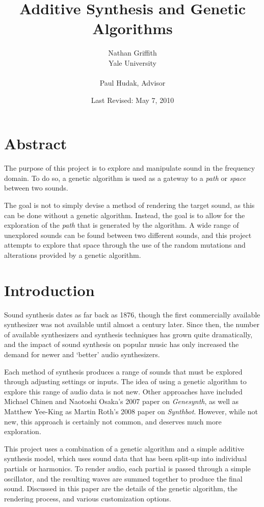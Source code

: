 \documentclass[11pt]{article}
\title{Additive Synthesis and Genetic Algorithms}
\author{Nathan Griffith\\Yale University
        \\\\Paul Hudak, Advisor}
\date{Last Revised: May 7, 2010}
\begin{document}
\maketitle %

\section{Abstract}

The purpose of this project is to explore and manipulate sound in the frequency domain. To do so, a genetic algorithm is used as a gateway to a \emph{path} or \emph{space} between two sounds. 

The goal is not to simply devise a method of rendering the target sound, as this can be done without a genetic algorithm. Instead, the goal is to allow for the exploration of the \emph{path} that is generated by the algorithm. A wide range of unexplored sounds can be found between two different sounds, and this project attempts to explore that space through the use of the random mutations and alterations provided by a genetic algorithm. 

\section{Introduction}

Sound synthesis dates as far back as 1876, though the first commercially available synthesizer was not available until almost a century later. Since then, the number of available synthesizers and synthesis techniques has grown quite dramatically, and the impact of sound synthesis on popular music has only increased the demand for newer and `better' audio synthesizers.

Each method of synthesis produces a range of sounds that must be explored through adjusting settings or inputs. The idea of using a genetic algorithm to explore this range of audio data is not new. Other approaches have included Michael Chinen and Naotoshi Osaka's 2007 paper on \emph{Genesynth}\cite{genesynth}, as well as Matthew Yee-King as Martin Roth's 2008 paper on \emph{Synthbot}\cite{synthbot}. However, while not new, this approach is certainly not common, and deserves much more exploration.

This project uses a combination of a genetic algorithm and a simple additive synthesis model, which uses sound data that has been split-up into individual partials or harmonics. To render audio, each partial is passed through a simple oscillator, and the resulting waves are summed together to produce the final sound. Discussed in this paper are the details of the genetic algorithm, the rendering process, and various customization options.
\end{document}
